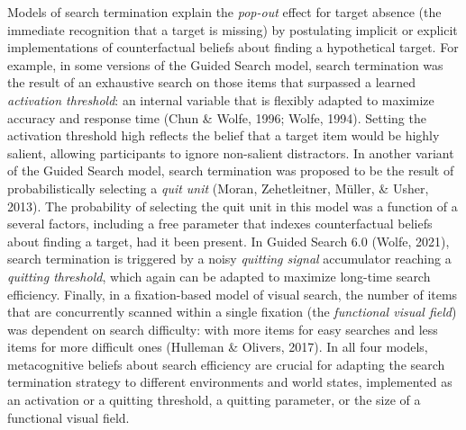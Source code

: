 \documentclass[
  english,
  man]{apa6}
\begin{document}
Models of search termination explain the \emph{pop-out} effect for target absence (the immediate recognition that a target is missing) by postulating implicit or explicit implementations of counterfactual beliefs about finding a hypothetical target. For example, in some versions of the Guided Search model, search termination was the result of an exhaustive search on those items that surpassed a learned \emph{activation threshold}: an internal variable that is flexibly adapted to maximize accuracy and response time (Chun \& Wolfe, 1996; Wolfe, 1994). Setting the activation threshold high reflects the belief that a target item would be highly salient, allowing participants to ignore non-salient distractors. In another variant of the Guided Search model, search termination was proposed to be the result of probabilistically selecting a \emph{quit unit} (Moran, Zehetleitner, Müller, \& Usher, 2013). The probability of selecting the quit unit in this model was a function of a several factors, including a free parameter that indexes counterfactual beliefs about finding a target, had it been present. In Guided Search 6.0 (Wolfe, 2021), search termination is triggered by a noisy \emph{quitting signal} accumulator reaching a \emph{quitting threshold}, which again can be adapted to maximize long-time search efficiency. Finally, in a fixation-based model of visual search, the number of items that are concurrently scanned within a single fixation (the \emph{functional visual field}) was dependent on search difficulty: with more items for easy searches and less items for more difficult ones (Hulleman \& Olivers, 2017). In all four models, metacognitive beliefs about search efficiency are crucial for adapting the search termination strategy to different environments and world states, implemented as an activation or a quitting threshold, a quitting parameter, or the size of a functional visual field.
\end{document}
